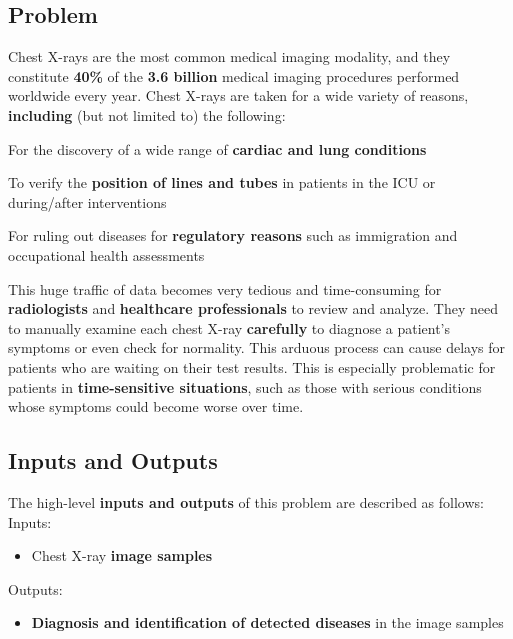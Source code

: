 \documentclass{article}
\begin{document}
\subsection{Problem}

Chest X-rays are the most common medical imaging modality, and they constitute \textbf{40\%} of the \textbf{3.6 billion} medical imaging procedures performed worldwide every year.
Chest X-rays are taken for a wide variety of reasons, \textbf{including} (but not limited to) the following:

\begin{itemize}
\begin{item}
For the discovery of a wide range of \textbf{cardiac and lung conditions}
\end{item}
\begin{item}
To verify the \textbf{position of lines and tubes} in patients in the ICU or during/after interventions
\end{item}
\begin{item}
For ruling out diseases for \textbf{regulatory reasons} such as immigration and occupational health assessments
\end{item}
\end{itemize}

\noindent This huge traffic of data becomes very tedious and time-consuming for \textbf{radiologists} and \textbf{healthcare professionals} to review and analyze.
They need to manually examine each chest X-ray \textbf{carefully} to diagnose a patient’s symptoms or even check for normality.
This arduous process can cause delays for patients who are waiting on their test results.
This is especially problematic for patients in \textbf{time-sensitive situations}, such as those with serious conditions whose symptoms could become worse over time.

\subsection{Inputs and Outputs}

The high-level \textbf{inputs and outputs} of this problem are described as follows:\\
Inputs:
\begin{itemize}
\item Chest X-ray \textbf{image samples}
\end{itemize}

\noindent Outputs:
\begin{itemize}
\item \textbf{Diagnosis and identification of detected diseases} in the image samples
\end{itemize} 
\end{document}
